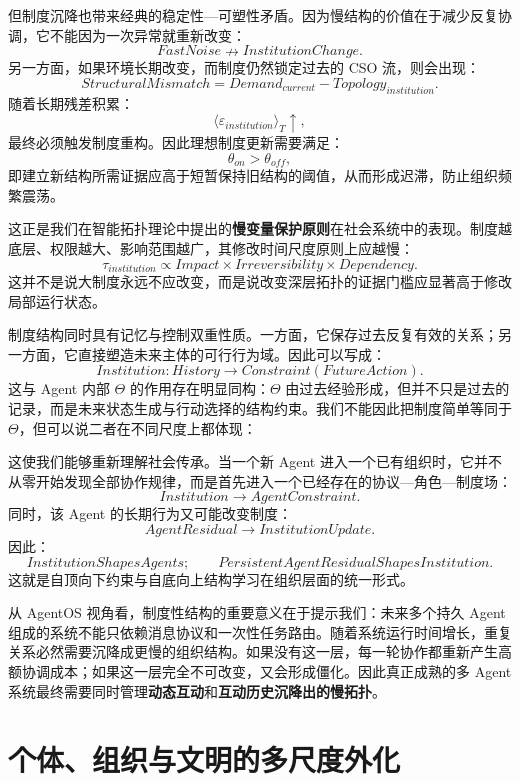 但制度沉降也带来经典的稳定性—可塑性矛盾。因为慢结构的价值在于减少反复协调，它不能因为一次异常就重新改变：
\[
FastNoise
\nrightarrow
InstitutionChange.
\]
另一方面，如果环境长期改变，而制度仍然锁定过去的 CSO 流，则会出现：
\[
StructuralMismatch
=
Demand_{current}
-
Topology_{institution}.
\]
随着长期残差积累：
\[
\langle \varepsilon_{institution}\rangle_T
\uparrow,
\]
最终必须触发制度重构。因此理想制度更新需要满足：
\[
\theta_{on}>\theta_{off},
\]
即建立新结构所需证据应高于短暂保持旧结构的阈值，从而形成迟滞，防止组织频繁震荡。

这正是我们在智能拓扑理论中提出的\textbf{慢变量保护原则}在社会系统中的表现。制度越底层、权限越大、影响范围越广，其修改时间尺度原则上应越慢：
\[
\tau_{institution}
\propto
Impact
\times
Irreversibility
\times
Dependency.
\]
这并不是说大制度永远不应改变，而是说改变深层拓扑的证据门槛应显著高于修改局部运行状态。

制度结构同时具有记忆与控制双重性质。一方面，它保存过去反复有效的关系；另一方面，它直接塑造未来主体的可行行为域。因此可以写成：
\[
Institution
:
History
\rightarrow
Constraint(FutureAction).
\]
这与 Agent 内部 $\Theta$ 的作用存在明显同构：$\Theta$ 由过去经验形成，但并不只是过去的记录，而是未来状态生成与行动选择的结构约束。我们不能因此把制度简单等同于 $\Theta$，但可以说二者在不同尺度上都体现：
\begin{statementbox}
\centering
{}
\end{statementbox}

这使我们能够重新理解社会传承。当一个新 Agent 进入一个已有组织时，它并不从零开始发现全部协作规律，而是首先进入一个已经存在的协议—角色—制度场：
\[
Institution
\rightarrow
AgentConstraint.
\]
同时，该 Agent 的长期行为又可能改变制度：
\[
AgentResidual
\rightarrow
InstitutionUpdate.
\]
因此：
\[
\boxed{
InstitutionShapesAgents;
\qquad
PersistentAgentResidualShapesInstitution.
}
\]
这就是自顶向下约束与自底向上结构学习在组织层面的统一形式。

从 AgentOS 视角看，制度性结构的重要意义在于提示我们：未来多个持久 Agent 组成的系统不能只依赖消息协议和一次性任务路由。随着系统运行时间增长，重复关系必然需要沉降成更慢的组织结构。如果没有这一层，每一轮协作都重新产生高额协调成本；如果这一层完全不可改变，又会形成僵化。因此真正成熟的多 Agent 系统最终需要同时管理\textbf{动态互动}和\textbf{互动历史沉降出的慢拓扑}。

\section{个体、组织与文明的多尺度外化}

